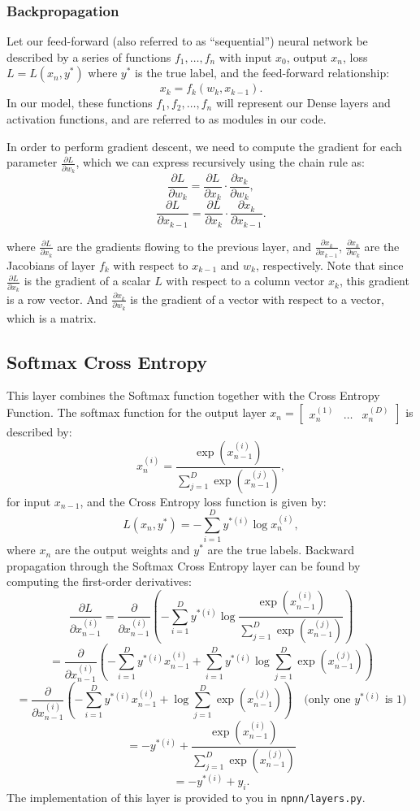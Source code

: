 \documentclass[a3paper,12pt]{extarticle} %
\begin{document}
\subsubsection*{Backpropagation}
Let our feed-forward (also referred to as “sequential”) neural network be described by a series of functions $f_1, \dots, f_n$ with input $x_0$, output $x_n$, loss $L = L(x_n, y^*)$ where $y^*$ is the true label, and the feed-forward relationship:
\[
x_k = f_k(w_k, x_{k-1}).
\]
In our model, these functions $f_1, f_2, \dots, f_n$ will represent our Dense layers and activation functions, and are referred to as modules in our code.

In order to perform gradient descent, we need to compute the gradient for each parameter $\frac{\partial L}{\partial w_k}$, which we can express recursively using the chain rule as:
\[
\frac{\partial L}{\partial w_k} = \frac{\partial L}{\partial x_k} \cdot \frac{\partial x_k}{\partial w_k},
\]
\[
\frac{\partial L}{\partial x_{k-1}} = \frac{\partial L}{\partial x_k} \cdot \frac{\partial x_k}{\partial x_{k-1}}.
\]

where $\frac{\partial L}{\partial x_k}$ are the gradients flowing to the previous layer, and $\frac{\partial x_k}{\partial x_{k-1}}$, $\frac{\partial x_k}{\partial w_k}$ are the Jacobians of layer $f_k$ with respect to $x_{k-1}$ and $w_k$, respectively. Note that since $\frac{\partial L}{\partial x_k}$ is the gradient of a scalar $L$ with respect to a column vector $x_k$, this gradient is a row vector. And $\frac{\partial x_k}{\partial w_k}$ is the gradient of a vector with respect to a vector, which is a matrix.

\subsection*{Softmax Cross Entropy}
This layer combines the Softmax function together with the Cross Entropy Function. The softmax function for the output layer $x_n = \begin{bmatrix} x^{(1)}_n & \dots & x^{(D)}_n \end{bmatrix}$ is described by:
\[
x^{(i)}_n = \frac{\exp(x^{(i)}_{n-1})}{\sum_{j=1}^D \exp(x^{(j)}_{n-1})},
\]
for input $x_{n-1}$, and the Cross Entropy loss function is given by:
\[
L(x_n, y^*) = -\sum_{i=1}^D y^{*(i)} \log x^{(i)}_n,
\]
where $x_n$ are the output weights and $y^*$ are the true labels. Backward propagation through the Softmax Cross Entropy layer can be found by computing the first-order derivatives:
\[
\frac{\partial L}{\partial x^{(i)}_{n-1}} = \frac{\partial}{\partial x^{(i)}_{n-1}} \left( -\sum_{i=1}^D y^{*(i)} \log \frac{\exp(x^{(i)}_{n-1})}{\sum_{j=1}^D \exp(x^{(j)}_{n-1})} \right)
\]
\[
= \frac{\partial}{\partial x^{(i)}_{n-1}} \left( -\sum_{i=1}^D y^{*(i)} x^{(i)}_{n-1} + \sum_{i=1}^D y^{*(i)} \log \sum_{j=1}^D \exp(x^{(j)}_{n-1}) \right)
\]
\[
= \frac{\partial}{\partial x^{(i)}_{n-1}} \left( -\sum_{i=1}^D y^{*(i)} x^{(i)}_{n-1} + \log \sum_{j=1}^D \exp(x^{(j)}_{n-1}) \right) \quad \text{(only one } y^{*(i)} \text{ is 1)}
\]
\[
= -y^{*(i)} + \frac{\exp(x^{(i)}_{n-1})}{\sum_{j=1}^D \exp(x^{(j)}_{n-1})}
\]
\[
= -y^{*(i)} + y_i.
\]
The implementation of this layer is provided to you in \texttt{npnn/layers.py}.
\end{document}
